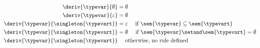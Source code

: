 \newsavebox\boxb
\begin{lrbox}{\boxb}
  \begin{minipage}{0.55\textwidth}
\begin{align*}
  \deriv{\typevar}{\emptyset}  &=\emptyset\\
  \deriv{\typevar}{\varepsilon} &=\emptyset\\
  \deriv{\typevar}{\singleton{\typevart}} &= \varepsilon \quad \text{ if } \sem{\typevar} \subseteq \sem{\typevart} \\
  \deriv{\typevar}{\singleton{\typevart}} &= \emptyset \quad \text{ if } \sem{\typevar} \setand \sem{\typevart}=\emptyset         \\
  \deriv{\typevar}{\singleton{\typevart}} &\quad   \text{ otherwise, no rule defined}   
\end{align*}
  \end{minipage}
\end{lrbox}



